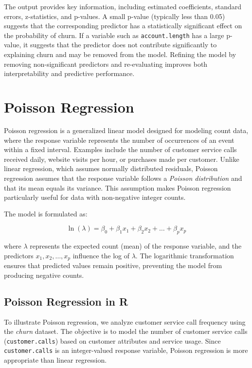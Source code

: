 \documentclass[
  11pt,
]{book}
\theoremstyle{definition}
\theoremstyle{definition}
\theoremstyle{definition}
\theoremstyle{definition}
\theoremstyle{remark}
\begin{document}
The output provides key information, including estimated coefficients, standard errors, z-statistics, and p-values. A small p-value (typically less than 0.05) suggests that the corresponding predictor has a statistically significant effect on the probability of churn. If a variable such as \texttt{account.length} has a large p-value, it suggests that the predictor does not contribute significantly to explaining churn and may be removed from the model. Refining the model by removing non-significant predictors and re-evaluating improves both interpretability and predictive performance.

\section{Poisson Regression}\label{poisson-regression}

Poisson regression is a generalized linear model designed for modeling count data, where the response variable represents the number of occurrences of an event within a fixed interval. Examples include the number of customer service calls received daily, website visits per hour, or purchases made per customer. Unlike linear regression, which assumes normally distributed residuals, Poisson regression assumes that the response variable follows a \emph{Poisson distribution} and that its mean equals its variance. This assumption makes Poisson regression particularly useful for data with non-negative integer counts.

The model is formulated as:

\[
\ln(\lambda) = \beta_0 + \beta_1 x_1 + \beta_2 x_2 + \dots + \beta_p x_p
\]

where \(\lambda\) represents the expected count (mean) of the response variable, and the predictors \(x_1, x_2, \dots, x_p\) influence the log of \(\lambda\). The logarithmic transformation ensures that predicted values remain positive, preventing the model from producing negative counts.

\subsection*{Poisson Regression in R}\label{poisson-regression-in-r}


To illustrate Poisson regression, we analyze customer service call frequency using the \emph{churn} dataset. The objective is to model the number of customer service calls (\texttt{customer.calls}) based on customer attributes and service usage. Since \texttt{customer.calls} is an integer-valued response variable, Poisson regression is more appropriate than linear regression.
\end{document}
